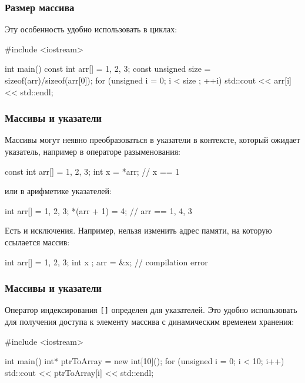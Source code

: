 \documentclass[compress, 8pt, aspectratio=169]{beamer}
\begin{document}
\begin{frame}[fragile]

    \frametitle{Размер массива}

    Эту особенность удобно использовать в циклах:

    \begin{myinplacelisting}[minted language=cpp]
#include <iostream>

int main() {
    const int arr[] = {1, 2, 3};
    const unsigned size
        = sizeof(arr)/sizeof(arr[0]);
    for (unsigned i = 0; i < size ; ++i) {
        std::cout << arr[i] << std::endl;
    }
}
    \end{myinplacelisting}

\end{frame}

\begin{frame}[fragile]

    \frametitle{Массивы и указатели}

    Массивы могут неявно преобразоваться в указатели в контексте,
    который ожидает указатель, например в операторе разыменования:

    \begin{myinplacelisting}[minted language=cpp]
const int arr[] = {1, 2, 3};
int x = *arr; // x == 1
    \end{myinplacelisting}

    или в арифметике указателей:

    \begin{myinplacelisting}[minted language=cpp]
int arr[] = {1, 2, 3};
*(arr + 1) = 4; // arr == {1, 4, 3}
    \end{myinplacelisting}

    Есть и исключения.
    Например, нельзя изменить адрес памяти, на которую ссылается массив:

    \begin{myinplacelisting}[minted language=cpp]
int arr[] = {1, 2, 3};
int x {};
arr = &x; // compilation error
    \end{myinplacelisting}

\end{frame}

\begin{frame}[fragile]

    \frametitle{Массивы и указатели}

    Оператор индексирования \verb|[]| определен для указателей.
    Это удобно использовать для получения доступа к элементу массива с
    динамическим временем хранения:

    \begin{myinplacelisting}[minted language=cpp]
#include <iostream>

int main() {
    int* ptrToArray = new int[10]();
    for (unsigned i = 0; i < 10; i++) {
        std::cout << ptrToArray[i] << std::endl;
    }
}
    \end{myinplacelisting}

\end{frame}
\end{document}
